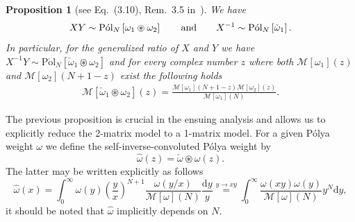 \documentclass[pdflatex,sn-mathphys-num]{sn-jnl}
\theoremstyle{thmstyleone}
\newtheorem{proposition}[theorem]{Proposition}
\numberwithin{equation}{section}
\begin{document}
\begin{proposition}[see Eq.~(3.10), Rem.~3.5 in~\cite{kieburgProductsRandomMatrices2019}]\label{polya1}
        We have
        \begin{align}
            XY\sim\mathrm{P\acute{o}l}_{N}\left [ \omega_{1}\circledast \omega_{2} \right ] \qquad{\rm and}\qquad X^{-1}\sim\mathrm{P\acute{o}l}_{N}\left [ \check{\omega}_{1} \right ].
        \end{align}
        In particular, for the generalized ratio of $X$ and $Y$ we have $X^{-1}Y\sim\mathrm{P\acute{o}l}_{N}\left [ \check{\omega}_{1}\circledast \omega_{2} \right ]$ and for every complex number $z$ where both $\mathcal{M}\left [ \omega_{1} \right ](z)$ and $\mathcal{M}\left [ \omega_{2} \right ](N+1-z)$ exist the following holds
        \begin{align}
            \mathcal{M}\left [ \check{\omega}_{1}\circledast \omega_{2} \right ]\left ( z \right )=\frac{\mathcal{M}\left [ \omega_{1} \right ]\left ( N+1-z \right )\mathcal{M}\left [ \omega_{2} \right ]\left ( z \right )}{\mathcal{M}[\omega_1](N)}.
        \end{align}
\end{proposition}
The previous proposition is crucial in the ensuing analysis and allows us to explicitly reduce the 2-matrix model to a 1-matrix model. For a given P\'olya weight $\omega$ we define the self-inverse-convoluted P\'olya weight by
\begin{equation}\label{omegahat}
    \widehat{\omega}(z)= \check{\omega}\circledast \omega\left(z\right).
\end{equation}
The latter may be written explicitly as follows
\begin{equation}\label{combi}
\widehat\omega(x)=\int_0^\infty \omega(y)\left(\frac{y}{x}\right)^{N+1}\frac{\omega\left(y/x\right)}{\mathcal{M}[\omega](N)}  \frac{\mathrm{d}y}{y}\overset{y\to xy}{=}\int_0^\infty \frac{\omega(xy)\omega(y)}{\mathcal{M}[\omega](N)} y^{N} \mathrm{d}y,
\end{equation}
it should be noted that $\widehat{\omega}$ implicitly depends on $N$.
\end{document}
